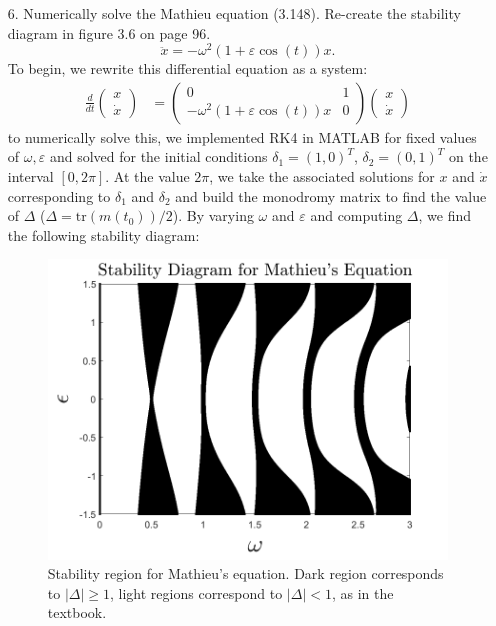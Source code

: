 \documentclass{article}
\begin{document}
\begin{itemize}
    
    \pagebreak
    


    \item[6.] Numerically solve the Mathieu equation (3.148). Re-create the stability diagram in figure 3.6 on page 96.
    \[\ddot{x} = -\omega^2(1 + \varepsilon\cos(t))x.\]
    To begin, we rewrite this differential equation as a system:
    \begin{align*}
        \frac{d}{dt}\begin{pmatrix}
            x\\
            \dot{x}
        \end{pmatrix} &= \begin{pmatrix}
            0 & 1\\
            -\omega^2(1 + \varepsilon\cos(t))x & 0
        \end{pmatrix}
        \begin{pmatrix}
            x\\
            \dot{x}
        \end{pmatrix}
    \end{align*}
    to numerically solve this, we implemented RK4 in MATLAB for fixed values of $\omega, \varepsilon$ and solved for the initial conditions $\delta_1 = (1,0)^T$, $\delta_2 = (0,1)^T$ on the interval $[0,2\pi]$. At the value $2\pi$, we take the associated solutions for $x$ and $\dot{x}$ corresponding to $\delta_1$ and $\delta_2$ and build the monodromy matrix to find the value of $\Delta$ ($\Delta = \text{tr}(m(t_0))/2$). By varying $\omega$ and $\varepsilon$ and computing $\Delta$, we find the following stability diagram:
    \begin{figure}[H]
        \includegraphics[scale = 0.35]{mathieu_stability_fine.png}
        \centering
        \caption{Stability region for Mathieu's equation. Dark region corresponds to $|\Delta| \geq 1$, light regions correspond to $|\Delta| < 1$, as in the textbook.}
    \end{figure}
    
\end{itemize}
\end{document}
